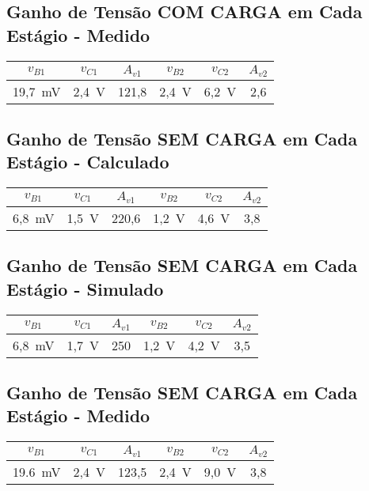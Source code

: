 \subsection{Ganho de Tensão COM CARGA em Cada Estágio - Medido}
\begin{center}
    \begin{tabular}{|c|c|c|c|c|c|}
        \hline
        $v_{B1}$ & $v_{C1}$ & $A_{v1}$ & $v_{B2}$ & $v_{C2}$ & $A_{v2}$ \\
        \hline
        19,7~mV & 2,4~V & 121,8 & 2,4~V & 6,2~V & 2,6 \\
        \hline
    \end{tabular}
\end{center}

\subsection{Ganho de Tensão SEM CARGA em Cada Estágio - Calculado}
\begin{center}
    \begin{tabular}{|c|c|c|c|c|c|}
        \hline
        $v_{B1}$ & $v_{C1}$ & $A_{v1}$ & $v_{B2}$ & $v_{C2}$ & $A_{v2}$ \\
        \hline
        6,8~mV & 1,5~V & 220,6 & 1,2~V & 4,6~V & 3,8 \\
        \hline
    \end{tabular}
\end{center}

\subsection{Ganho de Tensão SEM CARGA em Cada Estágio - Simulado}
\begin{center}
    \begin{tabular}{|c|c|c|c|c|c|}
        \hline
        $v_{B1}$ & $v_{C1}$ & $A_{v1}$ & $v_{B2}$ & $v_{C2}$ & $A_{v2}$ \\
        \hline
        6,8~mV & 1,7~V & 250 & 1,2~V & 4,2~V & 3,5 \\
        \hline
    \end{tabular}
\end{center}

\subsection{Ganho de Tensão SEM CARGA em Cada Estágio - Medido}
\begin{center}
    \begin{tabular}{|c|c|c|c|c|c|}
        \hline
        $v_{B1}$ & $v_{C1}$ & $A_{v1}$ & $v_{B2}$ & $v_{C2}$ & $A_{v2}$ \\
        \hline
        19.6~mV & 2,4~V & 123,5 & 2,4~V & 9,0~V & 3,8 \\
        \hline
    \end{tabular}
\end{center}


